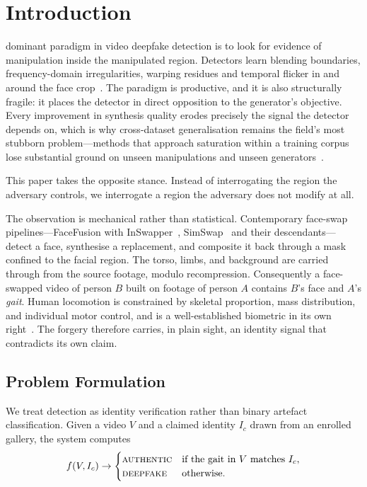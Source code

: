 \documentclass[journal]{IEEEtran}
\begin{document}
\section{Introduction}
\label{sec:intro}

 dominant paradigm in video deepfake detection is to look
for evidence of manipulation inside the manipulated region. Detectors learn
blending boundaries, frequency-domain irregularities, warping residues and
temporal flicker in and around the face
crop~\cite{recce,multi_attn,ftcn,altfreezing,fsbi}. The paradigm is
productive, and it is also structurally fragile: it places the detector in
direct opposition to the generator's objective. Every improvement in synthesis
quality erodes precisely the signal the detector depends on, which is why
cross-dataset generalisation remains the field's most stubborn
problem---methods that approach saturation within a training corpus lose
substantial ground on unseen manipulations and unseen
generators~\cite{recce,ftcn,deepfake_eval}.

This paper takes the opposite stance. Instead of interrogating the region the
adversary controls, we interrogate a region the adversary does not modify at
all.

The observation is mechanical rather than statistical. Contemporary face-swap
pipelines---FaceFusion with InSwapper~\cite{facefusion,insightface},
SimSwap~\cite{simswap} and their descendants---detect a face, synthesise a
replacement, and composite it back through a mask confined to the facial
region. The torso, limbs, and background are carried through from the source
footage, modulo recompression. Consequently a face-swapped video of person $B$
built on footage of person $A$ contains $B$'s face and $A$'s \emph{gait}. Human
locomotion is constrained by skeletal proportion, mass distribution, and
individual motor control, and is a well-established biometric in its own
right~\cite{gaitgraph,gaitpt,gaitformer,perry_gait,winter_biomech}. The forgery
therefore carries, in plain sight, an identity signal that contradicts its own
claim.

\subsection{Problem Formulation}

We treat detection as identity verification rather than binary artefact
classification. Given a video $V$ and a claimed identity $I_c$ drawn from an
enrolled gallery, the system computes
\begin{equation}
f(V, I_c) \rightarrow
\begin{cases}
\textsc{authentic} & \text{if the gait in } V \text{ matches } I_c,\\
\textsc{deepfake}  & \text{otherwise.}
\end{cases}
\label{eq:problem}
\end{equation}
\end{document}
